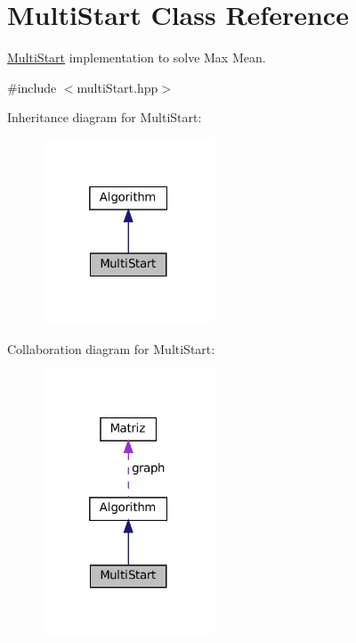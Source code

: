 \hypertarget{classMultiStart}{}\section{Multi\+Start Class Reference}
\label{classMultiStart}


\hyperlink{classMultiStart}{Multi\+Start} implementation to solve Max Mean.  




{\ttfamily \#include $<$multi\+Start.\+hpp$>$}



Inheritance diagram for Multi\+Start\+:\nopagebreak
\begin{figure}[H]
\begin{center}
\leavevmode
\includegraphics[width=145pt]{classMultiStart__inherit__graph}
\end{center}
\end{figure}


Collaboration diagram for Multi\+Start\+:\nopagebreak
\begin{figure}[H]
\begin{center}
\leavevmode
\includegraphics[width=145pt]{classMultiStart__coll__graph}
\end{center}
\end{figure}

